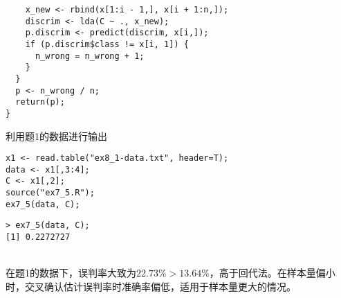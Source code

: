 \begin{enumerate}
\begin{lstlisting}
    x_new <- rbind(x[1:i - 1,], x[i + 1:n,]);
    discrim <- lda(C ~ ., x_new);
    p.discrim <- predict(discrim, x[i,]);
    if (p.discrim$class != x[i, 1]) {
      n_wrong = n_wrong + 1;
    }
  }
  p <- n_wrong / n;
  return(p);
}
\end{lstlisting}
利用题1的数据进行输出
\begin{lstlisting}
x1 <- read.table("ex8_1-data.txt", header=T);
data <- x1[,3:4];
C <- x1[,2];
source("ex7_5.R");
ex7_5(data, C);
\end{lstlisting}
        \out
\begin{lstlisting}
> ex7_5(data, C);
[1] 0.2272727
\end{lstlisting}
        \summary\\
        在题1的数据下，误判率大致为$22.73\% > 13.64\%$，高于回代法。在样本量偏小时，交叉确认估计误判率时准确率偏低，适用于样本量更大的情况。
    \end{enumerate}
\clearpage